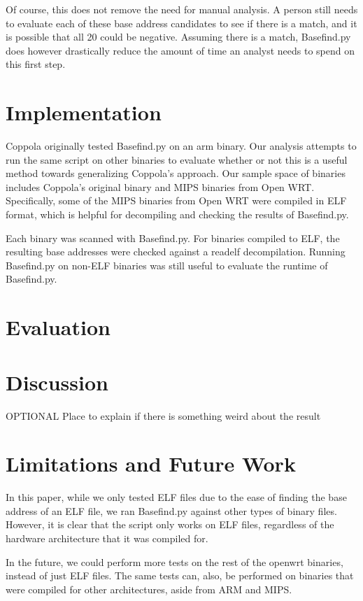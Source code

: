 \documentclass[letterpaper,twocolumn,10pt]{article}
\begin{document}
Of course, this does not remove the need for manual analysis. A person still needs to evaluate each of these base address candidates to see if there is a match, and it is possible that all 20 could be negative. Assuming there is a match, Basefind.py does however drastically reduce the amount of time an analyst needs to spend on this first step. 

\section{Implementation}
Coppola\cite{cloudscale2013} originally tested Basefind.py on an arm binary. Our analysis attempts to run the same script on other binaries to evaluate whether or not this is a useful method towards generalizing Coppola's approach. Our sample space of binaries includes Coppola's original binary and MIPS binaries from Open WRT. Specifically, some of the MIPS binaries from Open WRT were compiled in ELF format, which is helpful for decompiling and checking the results of Basefind.py.

Each binary was scanned with Basefind.py. For binaries compiled to ELF, the resulting base addresses were checked against a readelf decompilation. Running Basefind.py on non-ELF binaries was still useful to evaluate the runtime of Basefind.py.

\section{Evaluation}

\section{Discussion}
OPTIONAL
Place to explain if there is something weird about the result

\section{Limitations and Future Work}
In this paper, while we only tested ELF files due to the ease of finding the base address of an ELF file, we ran Basefind.py against other types of binary files. However, it is clear that the script only works on ELF files, regardless of the hardware architecture that it was compiled for. 

In the future, we could perform more tests on the rest of the openwrt binaries, instead of just ELF files. The same tests can, also, be performed on binaries that were compiled for other architectures, aside from ARM and MIPS. 
\end{document}
